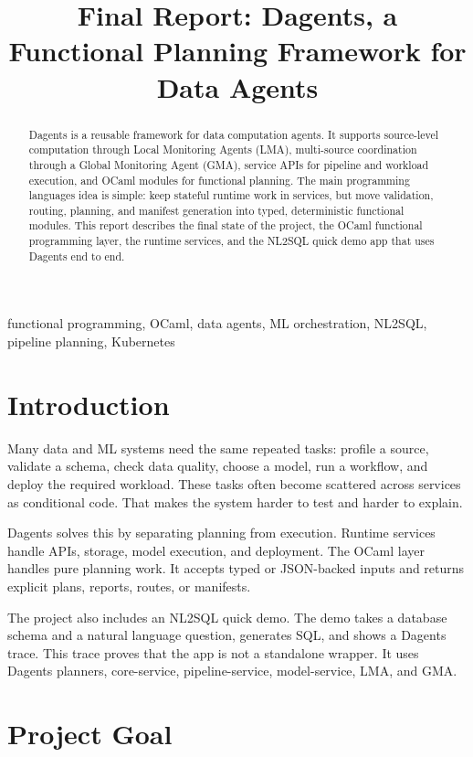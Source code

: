 \documentclass[conference]{IEEEtran}
\title{Final Report: Dagents, a Functional Planning Framework for Data Agents}
\author{
\IEEEauthorblockN{Pradyun Devarakonda \quad Dheeraj Rajanala}
\IEEEauthorblockA{
Programming Languages Course Project\\
IMT2022525, IMT2022093}
}
\begin{document}
\maketitle

\begin{abstract}
Dagents is a reusable framework for data computation agents. It supports
source-level computation through Local Monitoring Agents (LMA), multi-source
coordination through a Global Monitoring Agent (GMA), service APIs for pipeline
and workload execution, and OCaml modules for functional planning. The main
programming languages idea is simple: keep stateful runtime work in services,
but move validation, routing, planning, and manifest generation into typed,
deterministic functional modules. This report describes the final state of the
project, the OCaml functional programming layer, the runtime services, and the
NL2SQL quick demo app that uses Dagents end to end.
\end{abstract}

\begin{IEEEkeywords}
functional programming, OCaml, data agents, ML orchestration, NL2SQL,
pipeline planning, Kubernetes
\end{IEEEkeywords}

\section{Introduction}

Many data and ML systems need the same repeated tasks: profile a source,
validate a schema, check data quality, choose a model, run a workflow, and
deploy the required workload. These tasks often become scattered across
services as conditional code. That makes the system harder to test and harder
to explain.

Dagents solves this by separating planning from execution. Runtime services
handle APIs, storage, model execution, and deployment. The OCaml layer handles
pure planning work. It accepts typed or JSON-backed inputs and returns explicit
plans, reports, routes, or manifests.

The project also includes an NL2SQL quick demo. The demo takes a database
schema and a natural language question, generates SQL, and shows a Dagents
trace. This trace proves that the app is not a standalone wrapper. It uses
Dagents planners, core-service, pipeline-service, model-service, LMA, and GMA.

\section{Project Goal}
\end{document}
